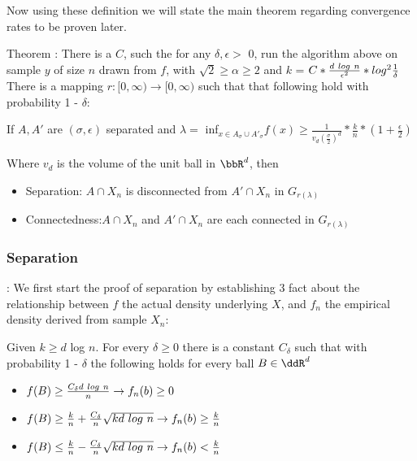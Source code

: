 \documentclass{article}
\begin{document}
\vspace{\baselineskip}
Now using these definition we will state the main theorem regarding convergence rates to be proven later.

\vspace{\baselineskip}
Theorem : There is a $C$, such the for any $\delta, \epsilon > $  0, run the algorithm above on sample $y$ of size $n$ drawn from $f$, with $\sqrt{2} \geq \alpha \geq 2$ and $k$ = $C* \frac{d \-\ log \-\ n}{\epsilon^2}* log^2 \frac{1}{\delta}$ There is a mapping $r: [0, \infty) \rightarrow [0, \infty)$ such that that following hold with probability 1 - $\delta$:

If $A, A'$ are $(\sigma, \epsilon)$ separated and $\lambda = $ inf$_{x\in A_{\sigma} \cup A'_{\sigma}}f(x) \geq \frac{1}{v_d(\frac{\sigma}{2})^d} * \frac{k}{n}*(1+\frac{\epsilon}{2})$

Where $v_d$ is the volume of the unit ball in $\bbR^d$, then 
\begin{itemize}
  \item  Separation: $A \cap X_n$ is disconnected from $A' \cap X_n$ in $G_{r(\lambda)}$
  \item Connectedness:$A \cap X_n$ and $A' \cap X_n$ are each connected in $G_{r(\lambda)}$
\end{itemize}

\subsubsection{Separation}:
We first start the proof of separation by establishing 3 fact about the relationship between $f$ the actual density underlying $X$, and $f_n$ the empirical density derived from sample $X_n$:

Given $k \geq d$ log $n$.  For every $\delta \geq 0$ there is a constant $C_{\delta}$ such that with probability 1 - $\delta$ the following holds for every ball $B \in \ddR^d$

\begin{itemize}
  \item  $f(B) \geq \frac{C_{\delta} d \-\ log \-\ n}{n} \rightarrow f_n(b) \geq 0$
  \item $f(B) \geq \frac{k}{n} + \frac{C_{\delta}}{n}\sqrt{kd \-\ log \-\ n} \rightarrow f_n(b) \geq \frac{k}{n}$
  \item $f(B) \leq \frac{k}{n} - \frac{C_{\delta}}{n}\sqrt{kd \-\ log \-\ n} \rightarrow f_n(b) < \frac{k}{n}$
\end{itemize}
\end{document}
